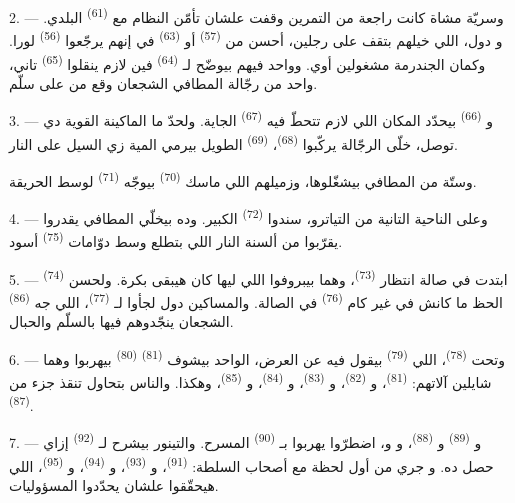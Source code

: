 2. --- وسريّة مشاة كانت راجعة من التمرين وقفت علشان تأمّن النظام مع
 \textsuperscript{(61)} البلدي. و دول، اللي
خيلهم بتقف على رجلين، أحسن من  \textsuperscript{(57)} أو
 \textsuperscript{(63)} في إنهم يرجّعوا 
\textsuperscript{(56)} لورا.
وكمان الجندرمة مشغولين أوي. وواحد فيهم بيوضّح لـ
\textsuperscript{(64)} فين لازم ينقلوا  \textsuperscript{(65)} تاني، واحد
من رجّالة المطافي الشجعان وقع من على سلّم.

3. --- و \textsuperscript{(66)} بيحدّد المكان اللي لازم تتحطّ فيه
 \textsuperscript{(67)} الجاية. ولحدّ ما الماكينة القوية دي
توصل، خلّى الرجّالة يركّبوا  \textsuperscript{(68)}،
 \textsuperscript{(69)} الطويل بيرمي المية زي السيل على النار.

وستّة من المطافي بيشغّلوها، وزميلهم اللي ماسك 
\textsuperscript{(70)} بيوجّه  \textsuperscript{(71)} لوسط الحريقة.

4. --- وعلى الناحية التانية من التياترو، سندوا  \textsuperscript{(72)}
الكبير. وده بيخلّي المطافي يقدروا يقرّبوا من ألسنة النار اللي بتطلع وسط دوّامات
 \textsuperscript{(75)} أسود.

\VUsaut{5.0mm}
\VUsaut{3.4mm}

5. ---  \textsuperscript{(74)} ابتدت في صالة انتظار
 \textsuperscript{(73)}، وهما بيبروفوا  اللي
 ليها كان هيبقى بكرة. ولحسن الحظ ما كانش في غير كام
 \textsuperscript{(76)} في الصالة. والمساكين دول لجأوا لـ
\textsuperscript{(77)}، اللي جه  \textsuperscript{(86)} الشجعان
ينجّدوهم فيها بالسلّم والحبال.

6. --- وتحت  \textsuperscript{(78)}، اللي 
\textsuperscript{(79)} بيقول فيه عن العرض، الواحد بيشوف 
\textsuperscript{(81)}  \textsuperscript{(80)} بيهربوا وهما شايلين
آلاتهم:  \textsuperscript{(81)}، و \textsuperscript{(82)}،
و \textsuperscript{(83)}، و \textsuperscript{(84)}،
و \textsuperscript{(85)}، وهكذا. والناس بتحاول تنقذ جزء من
 \textsuperscript{(87)}.

7. --- و \textsuperscript{(89)} و
\textsuperscript{(88)}، و و، اضطرّوا يهربوا
بـ \textsuperscript{(90)} المسرح. والتينور بيشرح لـ
\textsuperscript{(92)} إزاي حصل ده. و جري من أول لحظة مع أصحاب
السلطة:  \textsuperscript{(91)}، و
\textsuperscript{(93)}، و \textsuperscript{(94)}، و \textsuperscript{(95)}، اللي هيحقّقوا علشان يحدّدوا المسؤوليات.

\VUsaut{6.0mm}
\VUfilet{22mm}
